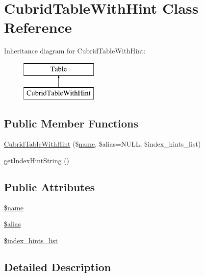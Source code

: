 \hypertarget{classCubridTableWithHint}{}\section{Cubrid\+Table\+With\+Hint Class Reference}
\label{classCubridTableWithHint}
Inheritance diagram for Cubrid\+Table\+With\+Hint\+:\begin{figure}[H]
\begin{center}
\leavevmode
\includegraphics[height=2.000000cm]{classCubridTableWithHint}
\end{center}
\end{figure}
\subsection*{Public Member Functions}
\begin{DoxyCompactItemize}
\item 
\hyperlink{classCubridTableWithHint_a48c29472127ace98b9115e149abc664c}{Cubrid\+Table\+With\+Hint} (\$\hyperlink{common_8js_a22c29d2aa8ed6161ce8faa718ef76e68}{name}, \$alias=N\+U\+LL, \$index\+\_\+hints\+\_\+list)
\item 
\hyperlink{classCubridTableWithHint_a581b44828759682ddda5ccbe7709d88b}{get\+Index\+Hint\+String} ()
\end{DoxyCompactItemize}
\subsection*{Public Attributes}
\begin{DoxyCompactItemize}
\item 
\hyperlink{classCubridTableWithHint_a29881ddda6971b68daf8719236f3b3f4}{\$name}
\item 
\hyperlink{classCubridTableWithHint_a6d3d82772e30eaaeb3f4f2cb5f137934}{\$alias}
\item 
\hyperlink{classCubridTableWithHint_abd22f208291f463ef34e7d5eeb127996}{\$index\+\_\+hints\+\_\+list}
\end{DoxyCompactItemize}


\subsection{Detailed Description}


